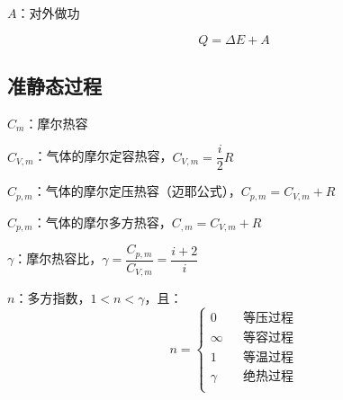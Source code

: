 \documentclass{article}
\begin{document}
$A$：对外做功

\[Q=\Delta E+A\]

\subsection{准静态过程}

$C_m$：摩尔热容

$C_{V,m}$：气体的摩尔定容热容，$C_{V,m}=\dfrac i2R$

$C_{p,m}$：气体的摩尔定压热容（迈耶公式），$C_{p,m}=C_{V,m}+R$

$C_{p,m}$：气体的摩尔多方热容，$C_{,m}=C_{V,m}+R$

$\gamma$：摩尔热容比，$\gamma=\dfrac{C_{p,m}}{C_{V,m}}=\dfrac{i+2}i$

$n$：多方指数，$1<n<\gamma$，且：
\[n=\left\{\begin{aligned}
        0      &  & \text{等压过程} \\
        \infty &  & \text{等容过程} \\
        1      &  & \text{等温过程} \\
        \gamma &  & \text{绝热过程} \\
    \end{aligned}\right.\]
\end{document}
